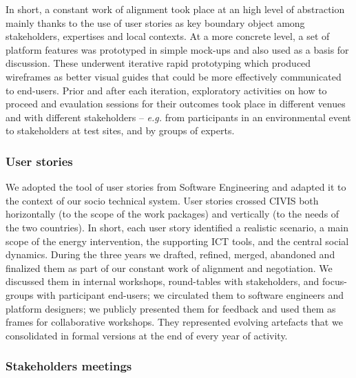 In short, a constant work of alignment took place at an high level of abstraction mainly thanks to
the use of user stories as key boundary object among stakeholders,
expertises and local contexts. At a more concrete level, a set of platform features was prototyped in simple mock-ups
and also used as a basis for discussion. These underwent iterative rapid prototyping which
produced wireframes as better visual guides that could be more effectively communicated to end-users.
Prior and after each iteration, exploratory activities on how to proceed and evaulation sessions for their outcomes
took place in different venues and with different stakeholders -- \textit{e.g.} from participants in
an environmental event \cite{Barssi2015} to stakeholders at test sites, and by groups of experts.


\subsubsection{User stories}

We adopted the tool of user stories \cite{Kankainen2012} from Software Engineering and adapted it to the context of our
socio technical system. User stories crossed CIVIS both horizontally (to the
scope of the work packages) and vertically (to the needs of the two countries). In short, each user
story identified a realistic scenario, a main scope of the energy intervention, the supporting ICT tools,
and the central social dynamics. During the three years we drafted, refined, merged, abandoned and
finalized them as part of our constant work of alignment and negotiation. We discussed them in internal
workshops, round-tables with stakeholders, and focus-groups with participant end-users; we circulated
them to software engineers and platform designers; we publicly presented them for feedback and used them
as frames for collaborative workshops. They represented evolving artefacts that we consolidated in formal
versions at the end of every year of activity. 


\subsubsection{Stakeholders meetings} %

